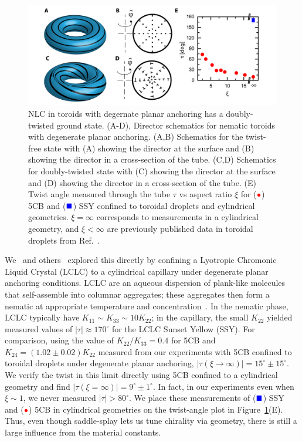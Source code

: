 \begin{figure}
  \centering
  \includegraphics{figures/C4/Ch4-Figs_PlanarTwist.png}
  \caption{NLC in toroids with degernate planar anchoring has a doubly-twisted ground state.
  (A-D), Director schematics for nematic toroids with degenerate planar anchoring.
  (A,B) Schematics for the twist-free state with (A) showing the director at the surface and (B) showing the director in a cross-section of the tube.
  (C,D) Schematics for doubly-twisted state with (C) showing the director at the surface and (D) showing the director in a cross-section of the tube.
  (E) Twist angle measured through the tube $\tau$ vs aspect ratio $\xi$ for (${\color{red} \bullet}$) 5CB and (${\color{blue} \blacksquare}$) SSY confined to toroidal droplets and cylindrical geometries.
  $\xi = \infty$ corresponds to measurements in a cylindrical geometry, and $\xi < \infty$ are previously published data in toroidal droplets from Ref.~\cite{RN24}.}\label{f:4-PlanarToroidsTwist}
\end{figure}

We~\cite{RN293} and others~\cite{RN191} explored this directly by confining a Lyotropic Chromonic Liquid Crystal (LCLC) to a cylindrical capillary under degenerate planar anchoring conditions.
LCLC are an aqueous dispersion of plank-like molecules that self-assemble into columnar aggregates; these aggregates then form a nematic at appropriate temperature and concentration~\cite{RN303}.
In the nematic phase, LCLC typically have $K_{11} \sim K_{33} \sim 10 K_{22}$; in the capillary, the small $K_{22}$ yielded measured values of $|\tau| \approx 170 ^{\circ}$ for the LCLC Sunset Yellow (SSY).
For comparison, using the value of $K_{22}/K_{33}=0.4$ for 5CB and $K_{24} = (1.02 \pm 0.02) K_{22}$ measured from our experiments with 5CB confined to toroidal droplets under degenerate planar anchoring, $|\tau (\xi \rightarrow \infty)| = 15^{\circ} \pm 15^{\circ}$.
We verify the twist in this limit directly using 5CB confined to a cylindrical geometry and find $|\tau (\xi = \infty)| = 9^{\circ} \pm 1^{\circ}$.
In fact, in our experiments even when $\xi \sim 1$, we never measured $|\tau| > 80^{\circ}$.
We place these measurements of (${\color{blue} \blacksquare}$) SSY and (${\color{red} \bullet}$) 5CB in cylindrical geometries on the twist-angle plot in Figure~\ref{f:4-PlanarToroidsTwist}(E).
Thus, even though saddle-splay lets us tune chirality via geometry, there is still a large influence from the material constants.

